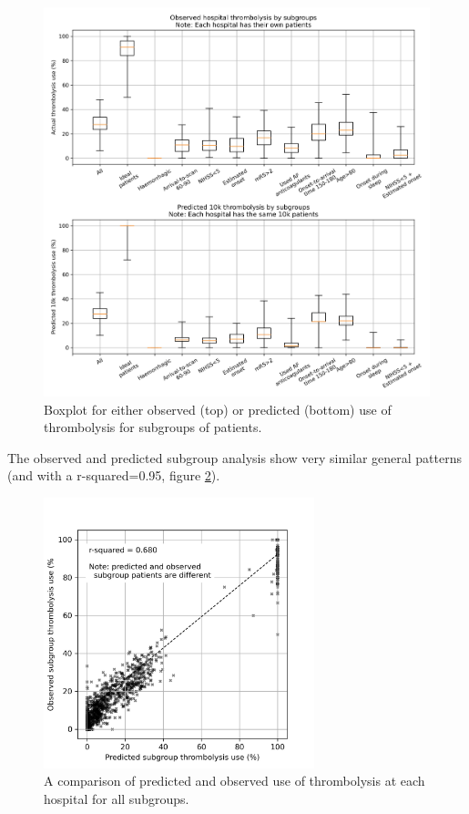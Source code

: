 \begin{figure}
\centering
\includegraphics[width=1\textwidth]{./images/15a_xgb_10_features_10k_cohort_actual_vs_modelled_subgroup_boxplot.jpg}%
\caption{Boxplot for either observed (top) or predicted (bottom) use of thrombolysis for subgroups of patients.}
\label{fig:subgroup_boxplot}
\end{figure}

The observed and predicted subgroup analysis show very similar general patterns (and with a r-squared=0.95, figure \ref{fig:subgroup_correlation}).

\begin{figure}
\centering
\includegraphics[width=0.7\textwidth]{./images/15a_subgroup_correlation}
\caption{A comparison of predicted and observed use of thrombolysis at each hospital for all subgroups.}
\label{fig:subgroup_correlation}
\end{figure}

